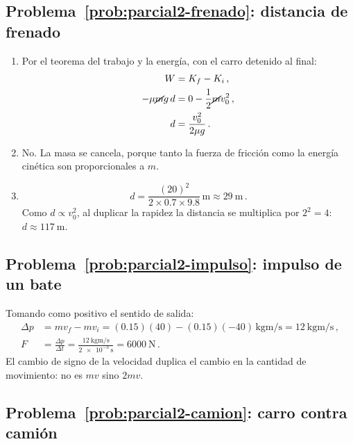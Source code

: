 \subsection*{Problema~\ref{prob:parcial2-frenado}: distancia de frenado}
\label{sol:parcial2-frenado}

\begin{enumerate}[label=\alph*)]
    \item Por el teorema del trabajo y la energía, con el carro detenido al
    final:
    \begin{align}
        W &= K_f - K_i\,, \nonumber\\
        -\mu \cancel{m} g\, d &= 0 - \frac{1}{2}\cancel{m}v_0^2\,, \nonumber\\
        d &= \frac{v_0^2}{2\mu g}\,.
    \end{align}
    \item No. La masa se cancela, porque tanto la fuerza de fricción como la
    energía cinética son proporcionales a $m$.
    \item
    \begin{equation}
        d = \frac{(20)^2}{2 \times 0.7 \times 9.8}\,\si{\meter}
          \approx \SI{29}{\meter}\,.
    \end{equation}
    Como $d \propto v_0^2$, al duplicar la rapidez la distancia se
    multiplica por $2^2 = 4$: $d \approx \SI{117}{\meter}$.
\end{enumerate}

\subsection*{Problema~\ref{prob:parcial2-impulso}: impulso de un bate}
\label{sol:parcial2-impulso}

Tomando como positivo el sentido de salida:
\begin{align}
    \Delta p &= m v_f - m v_i = (0.15)(40) - (0.15)(-40)\,\si{\kilogram\meter\per\second}
              = \SI{12}{\kilogram\meter\per\second}\,, \nonumber\\
    F &= \frac{\Delta p}{\Delta t}
       = \frac{\SI{12}{\kilogram\meter\per\second}}{\SI{2e-3}{\second}}
       = \SI{6000}{\newton}\,.
\end{align}
El cambio de signo de la velocidad duplica el cambio en la cantidad de
movimiento: no es $mv$ sino $2mv$.

\subsection*{Problema~\ref{prob:parcial2-camion}: carro contra camión}
\label{sol:parcial2-camion}

